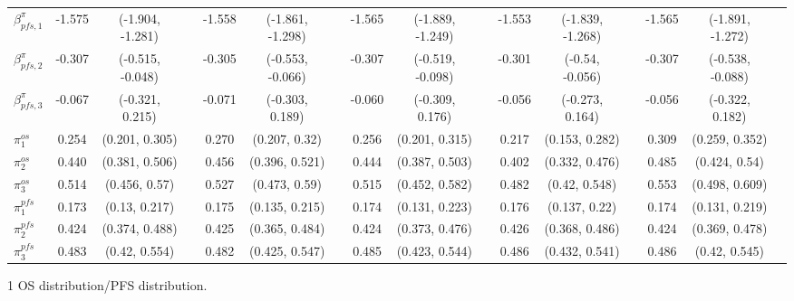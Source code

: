 \documentclass[AMA,STIX1COL]{WileyNJD-v2}
\begin{document}
\begin{landscape}
\begin{center}
\begin{table}[t]
\begin{tabular}{l c c c c c c c c c c c c c c c}
$\beta^{\pi}_{pfs, 1}$ & -1.575 & (-1.904, -1.281) &  & -1.558 & (-1.861, -1.298) &  & -1.565 & (-1.889, -1.249) &  & -1.553 & (-1.839, -1.268) &  & -1.565 & (-1.891, -1.272) & \\
$\beta^{\pi}_{pfs, 2}$ & -0.307 & (-0.515, -0.048) &  & -0.305 & (-0.553, -0.066) &  & -0.307 & (-0.519, -0.098) &  & -0.301 & (-0.54, -0.056) &  & -0.307 & (-0.538, -0.088) & \\
$\beta^{\pi}_{pfs, 3}$ & -0.067 & (-0.321, 0.215) &  & -0.071 & (-0.303, 0.189) &  & -0.060 & (-0.309, 0.176) &  & -0.056 & (-0.273, 0.164) &  & -0.056 & (-0.322, 0.182) & \\
$\pi^{os}_1$ & 0.254 & (0.201, 0.305) &  & 0.270 & (0.207, 0.32) &  & 0.256 & (0.201, 0.315) &  & 0.217 & (0.153, 0.282) &  & 0.309 & (0.259, 0.352) & \\
$\pi^{os}_2$ & 0.440 & (0.381, 0.506) &  & 0.456 & (0.396, 0.521) &  & 0.444 & (0.387, 0.503) &  & 0.402 & (0.332, 0.476) &  & 0.485 & (0.424, 0.54) & \\
$\pi^{os}_3$ & 0.514 & (0.456, 0.57) &  & 0.527 & (0.473, 0.59) &  & 0.515 & (0.452, 0.582) &  & 0.482 & (0.42, 0.548) &  & 0.553 & (0.498, 0.609) & \\
$\pi^{pfs}_1$ & 0.173 & (0.13, 0.217) &  & 0.175 & (0.135, 0.215) &  & 0.174 & (0.131, 0.223) &  & 0.176 & (0.137, 0.22) &  & 0.174 & (0.131, 0.219) & \\
$\pi^{pfs}_2$ & 0.424 & (0.374, 0.488) &  & 0.425 & (0.365, 0.484) &  & 0.424 & (0.373, 0.476) &  & 0.426 & (0.368, 0.486) &  & 0.424 & (0.369, 0.478) & \\
$\pi^{pfs}_3$ & 0.483 & (0.42, 0.554) &  & 0.482 & (0.425, 0.547) &  & 0.485 & (0.423, 0.544) &  & 0.486 & (0.432, 0.541) &  & 0.486 & (0.42, 0.545) & \\
\bottomrule
\end{tabular}
\begin{tablenotes}%
\item[1] OS distribution/PFS distribution.
\end{tablenotes}
\end{table}
\end{center}
\end{landscape}
\end{document}

